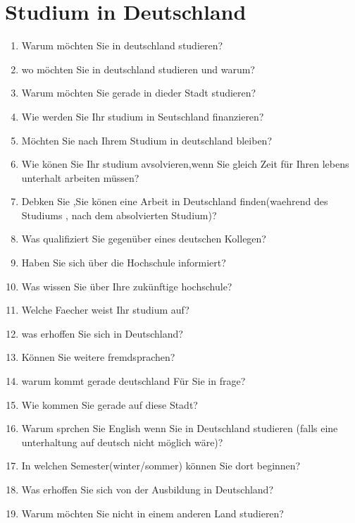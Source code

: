 \documentclass[b5paper, twoside]{ctexbook}
\begin{document}
\section{Studium in Deutschland}
\begin{enumerate}
  \item Warum m\"ochten Sie in deutschland studieren?
  \item wo m\"ochten Sie in deutschland studieren und warum?
  \item Warum m\"ochten Sie gerade in dieder Stadt studieren?
  \item Wie werden Sie Ihr studium in Seutschland finanzieren?
  \item M\"ochten Sie nach Ihrem Studium in deutschland bleiben?
  \item Wie k\"onen Sie Ihr studium avsolvieren,wenn Sie gleich Zeit f\"ur Ihren lebens unterhalt arbeiten m\"ussen?
  \item Debken Sie ,Sie k\"onen eine Arbeit in Deutschland finden(waehrend des Studiums , nach dem absolvierten Studium)?
  \item Was qualifiziert Sie gegen\"uber eines deutschen Kollegen?
  \item Haben Sie sich \"uber die Hochschule informiert?
  \item Was wissen Sie \"uber Ihre zuk\"unftige hochschule?
  \item Welche Faecher weist Ihr studium auf?
  \item was erhoffen Sie sich in Deutschland?
  \item K\"onnen Sie weitere fremdsprachen?
  \item warum kommt gerade deutschland F\"ur Sie in frage?
  \item Wie kommen Sie gerade auf diese Stadt?
  \item Warum sprchen Sie English wenn Sie in Deutschland studieren (falls eine unterhaltung auf deutsch nicht m\"oglich w\"are)?
  \item In welchen Semester(winter/sommer) k\"onnen Sie dort beginnen?
  \item Was erhoffen Sie sich von der Ausbildung in Deutschland?
  \item Warum möchten Sie nicht in einem anderen Land studieren?
\end{enumerate}
\end{document}
